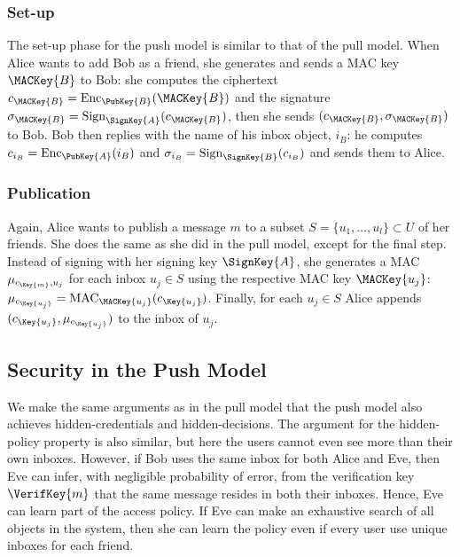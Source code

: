 \subsubsection{Set-up}

The set-up phase for the push model is similar to that of the pull model.
When Alice wants to add Bob as a friend, she generates and sends a \ac{MAC} key 
\(\MACKey{B}\) to Bob:
she computes the ciphertext \(c_{\MACKey{B}} = \Enc_{\PubKey{B}}( \MACKey{B} 
  )\) and the signature \(\sigma_{\MACKey{B}} = \Sign_{\SignKey{A}}( 
  c_{\MACKey{B}} )\), then she sends \((c_{\MACKey{B}}, \sigma_{\MACKey{B}})\) 
to Bob.
Bob then replies with the name of his inbox object, \(i_B\):
he computes \(c_{i_B} = \Enc_{\PubKey{A}}( i_B )\) and \(\sigma_{i_B} 
  = \Sign_{\SignKey{B}}( c_{i_B} )\) and sends them to Alice.

\subsubsection{Publication}

Again, Alice wants to publish a message \(m\) to a subset \(S = \{u_1, \ldots, 
  u_l\}\subset U\) of her friends.
She does the same as she did in the pull model, except for the final step.
Instead of signing with her signing key \(\SignKey{A}\), she generates 
a \ac{MAC} \(\mu_{c_{\Key{m}}, u_j}\) for each inbox \(u_j\in S\) using the 
respective \ac{MAC} key \(\MACKey{u_j}\): \(\mu_{c_{\Key{u_j}}} 
  = \MAC_{\MACKey{u_j}}( c_{\Key{u_j}} )\).
Finally, for each \(u_j\in S\) Alice appends \((c_{\Key{u_j}}, 
  \mu_{c_{\Key{u_j}}})\) to the inbox of \(u_j\).

\subsection{Security in the Push Model}\label{sec:PushModelSec}

We make the same arguments as in the pull model that the push model also 
achieves hidden-credentials and hidden-decisions.
The argument for the hidden-policy property is also similar, but here the users 
cannot even see more than their own inboxes.
However, if Bob uses the same inbox for both Alice and Eve, then Eve can infer, 
with negligible probability of error, from the verification key 
\(\VerifKey{m}\) that the same message resides in both their inboxes.
Hence, Eve can learn part of the access policy.
If Eve can make an exhaustive search of all objects in the system, then she can 
learn the policy even if every user use unique inboxes for each friend.

